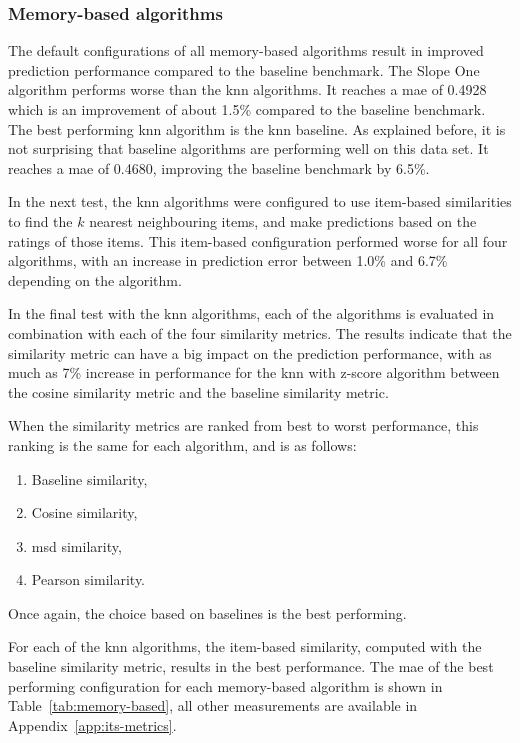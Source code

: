 \subsubsection{Memory-based algorithms}
The default configurations of all memory-based algorithms result in improved prediction performance compared to the baseline benchmark.
The Slope One algorithm performs worse than the \gls{knn} algorithms.
It reaches a \gls{mae} of 0.4928 which is an improvement of about 1.5\% compared to the baseline benchmark.
The best performing \gls{knn} algorithm is the \gls{knn} baseline.
As explained before, it is not surprising that baseline algorithms are performing well on this data set.
It reaches a \gls{mae} of 0.4680, improving the baseline benchmark by 6.5\%.


In the next test, the \gls{knn} algorithms were configured to use item-based similarities to find the $k$ nearest neighbouring items, and make predictions based on the ratings of those items.
This item-based configuration performed worse for all four algorithms, with an increase in prediction error between 1.0\% and 6.7\% depending on the algorithm.

In the final test with the \gls{knn} algorithms, each of the algorithms is evaluated in combination with each of the four similarity metrics.
The results indicate that the similarity metric can have a big impact on the prediction performance, with as much as 7\% increase in performance for the \gls{knn} with z-score algorithm between the cosine similarity metric and the baseline similarity metric.

When the similarity metrics are ranked from best to worst performance, this ranking is the same for each algorithm, and is as follows:
\begin{enumerate}[noitemsep]
    \item Baseline similarity,
    \item Cosine similarity,
    \item \gls{msd} similarity,
    \item Pearson similarity.
\end{enumerate}

Once again, the choice based on baselines is the best performing.

For each of the \gls{knn} algorithms, the item-based similarity, computed with the baseline similarity metric, results in the best performance.
The \gls{mae} of the best performing configuration for each memory-based algorithm is shown in Table~\ref{tab:memory-based}, all other measurements are available in Appendix~\ref{app:its-metrics}.

